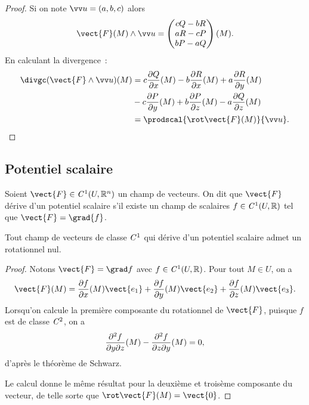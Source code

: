 \begin{proof}
  Si on note $\vu =(a, b, c)$ alors
  \begin{equation}
    \vect{F}(M) \wedge \vu = \begin{pmatrix} cQ-bR \\ aR-cP \\bP-aQ\end{pmatrix}(M).
  \end{equation}
  En calculant la divergence~:
  \begin{align}
    \divgc(\vect{F} \wedge \vu)(M) &=c \derivep{Q}{x}(M) -b\derivep{R}{x}(M) + a \derivep{R}{y}(M) \notag\\
    &-c\derivep{P}{y}(M) + b \derivep{P}{z}(M) -a\derivep{Q}{z}(M) \\
    &=\prodscal{\rot \vect{F}(M)}{\vu}.
  \end{align}
\end{proof}

\subsection{Potentiel scalaire}

\begin{defdef}
  Soient $\vect{F} \in \classe{1}(U, \R^n)$ un champ de vecteurs. On dit que $\vect{F}$ dérive d'un potentiel scalaire s'il existe un champ de scalaires $f \in \mathit{C}^1(U, \mathbb{R})$ tel que $\vect{F}=\grad{f}$.
\end{defdef}
\begin{prop}[Dans le cas où $n=3$]
  Tout champ de vecteurs de classe $\mathit{C}^1$ qui dérive d'un potentiel scalaire admet un rotationnel nul.
\end{prop}
\begin{proof}
  Notons $\vect{F}=\grad f$ avec $f \in \mathit{C}^1(U, \mathbb{R})$. Pour tout $M \in U$, on a
  \begin{equation}
    \vect{F}(M) = \derivep{f}{x}(M)\vect{e_1} +  \derivep{f}{y}(M)\vect{e_2} +  \derivep{f}{z}(M)\vect{e_3}.
  \end{equation}
  Lorsqu'on calcule la première composante du rotationnel de $\vect{F}$, puisque $f$ est de classe $\mathit{C}^2$, on a
  \begin{equation}
    \dfrac{\partial^2 f}{\partial {y} \partial {z}}(M)-\dfrac{\partial^2 f}{\partial {z} \partial {y}}(M)=0,
  \end{equation}
  d'après le théorème de Schwarz.

  Le calcul donne le même résultat pour la deuxième et troisème composante du vecteur, de telle sorte que $\rot\vect{F}(M)=\vect{0}$.
\end{proof}

